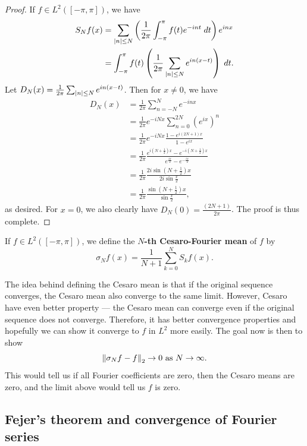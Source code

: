 \documentclass[a4paper]{article}
\begin{document}
\begin{proof}
If $f \in L^2([- \pi, \pi])$, we have 
\[
\begin{aligned}
S_N f(x) 
&= \sum_{\left\lvert n\right\rvert \leq N} \left( \frac{1}{2\pi} 
\int_{- \pi}^\pi f(t) e^{- i n t} \; d t \right) e^{i n x} \\
&= \int_{-\pi}^\pi f(t) \left( \frac{1}{2\pi} 
\sum_{\left\lvert n\right\rvert \leq N} e^{i n (x - t)} \right) \; d t.
\end{aligned}
\]
Let $D_N(x) = \frac{1}{2\pi} 
\sum_{\left\lvert n\right\rvert \leq N} e^{i n (x - t)}$. 
Then for $x \neq 0$, we have 
\[
\begin{aligned}
  D_N(x) 
  &= \frac{1}{2\pi} \sum_{n=-N}^{N} 
  e^{- i n x} \\ 
  &= \frac{1}{2\pi} e^{- i N x} \sum_{n=0}^{2N}
  \left( e^{i x} \right)^n \\
  &= \frac{1}{2\pi} e^{- i N x} 
  \frac{1 - e^{i (2N+1) x}}{1 - e^{i x}} \\
  &= \frac{1}{2\pi} \frac{e^{i (N + \frac{1}{2}) x} 
  - e^{- i (N + \frac{1}{2}) x}}{e^{\frac{ix}{2}} - 
  e^{-\frac{ix}{2}}} \\
  &= \frac{1}{2\pi} \frac{2 i \sin (N + \frac{1}{2})x}
  {2i \sin \frac{x}{2}} \\
  &= \frac{1}{2\pi} \frac{\sin (N + \frac{1}{2})x}
  {\sin \frac{x}{2}},
\end{aligned}
\]
as desired. For $x = 0$, we also clearly have 
$D_N(0) = \frac{(2N+1)}{2\pi}$. The proof is thus 
complete.
\end{proof}

\begin{defi}
If $f \in L^2([-\pi, \pi])$, we define the 
\textbf{$N$-th Cesaro-Fourier mean} of $f$ by 
\[
\sigma_N f(x) = \frac{1}{N+1} \sum_{k=0}^N 
S_k f(x).
\]
\end{defi}

The idea behind defining the Cesaro mean is that 
if the original sequence converges, the Cesaro mean 
also converge to the same limit. However, Cesaro 
have even better property --- the Cesaro mean 
can converge even if the original sequence does not 
converge. Therefore, it has better convergence properties
and hopefully we can show it converge to $f$ in $L^2$ more 
easily. The goal now is then to show 
\[
\left\lVert \sigma_N f - f\right\rVert_2 \to 0 \text{ as $N \to \infty$}.
\]
This would tell us if all Fourier coefficients are zero, 
then the Cesaro means are zero, and the limit above 
would tell us $f$ is zero.

\subsection{Fejer's theorem and convergence 
of Fourier series}
\end{document}
